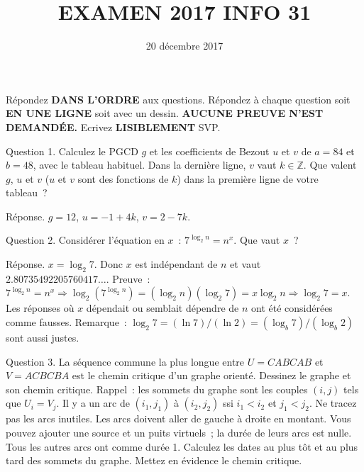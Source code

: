 \documentclass[a4paper,12pt]{article}
\def\Z{\mathbb{Z}}
\begin{document}
\title{EXAMEN 2017 INFO 31}
\date{20 décembre 2017}
\maketitle
Répondez {\bf DANS L'ORDRE} aux questions. Répondez à chaque question soit {\bf EN UNE LIGNE} soit avec un dessin. {\bf AUCUNE PREUVE N'EST DEMANDÉE.} Ecrivez 
{\bf LISIBLEMENT} SVP.

Question 1. Calculez le PGCD $g$ et les coefficients de Bezout $u$ et $v$ de $a=84$ et $b=48$, avec le tableau habituel.
Dans la dernière ligne,  $v$ vaut $k\in\Z$.
Que valent $g$,  $u$ et $v$ ($u$ et $v$ sont des fonctions de $k$) dans la première ligne de votre tableau~? 

Réponse. $g=12$, $u=-1+4k$, $v=2-7k$.

Question 2. Considérer l'équation en $x$~: $7^{\log_2 n}=n^x$.  Que vaut $x$~?

Réponse. $x= \log_2 7$. Donc $x$ est indépendant de $n$ et vaut $2.80735492205760417\ldots$.  Preuve~:
$7^{\log_2 n}=n^x \Rightarrow \log_2(7^{\log_2 n})= (\log_2 n)(\log_2 7)= x \log_2 n \Rightarrow  \log_2 7 = x$. Les réponses où $x$ dépendait ou semblait dépendre de $n$ ont été considérées comme fausses. 
Remarque~: $\log_2 7= (\ln 7) / (\ln 2)= (\log_b 7)/ (\log_b 2)$ sont aussi justes.

Question 3. La séquence commune la plus longue entre $U=CABCAB$ et $V=ACBCBA$ 
est le chemin critique d'un graphe orienté. Dessinez le graphe et son chemin critique.
Rappel~: les sommets
du graphe sont les couples $(i, j)$ tels que $U_i=V_j$. Il y a un arc  de $(i_1, j_1)$ à
$(i_2, j_2)$ ssi $i_1 < i_2$ et $j_1< j_2$. Ne tracez pas les arcs inutiles. 
Les arcs doivent aller de gauche à droite en montant.
Vous pouvez ajouter une source et un puits virtuels~; la durée de leurs arcs est nulle.
Tous les autres arcs ont comme durée 1.
Calculez les dates au plus tôt et au plus tard des sommets du graphe. Mettez en évidence le chemin critique.
\end{document}
